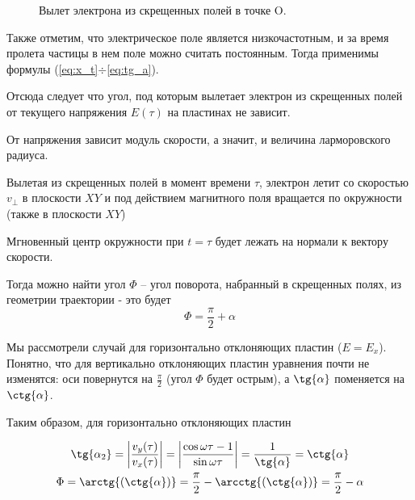 \begin{figure}[ht!]
\vspace{1cm}
\centering
\begin{minipage}[ht!]{0.49\linewidth}
\end{minipage}
\hfill
\begin{minipage}[ht!]{0.49\linewidth}
\end{minipage}
\vspace{0.5cm}
\caption{Вылет электрона из скрещенных полей в точке O.}
\vspace{1cm}
\label{ris:vert_hor}
\end{figure}

Также отметим, что электрическое поле является низкочастотным, и за время пролета частицы в нем поле можно считать постоянным. Тогда применимы формулы (\ref{eq:x_t}$\div$\ref{eq:tg_a}).

Отсюда следует что угол, под которым вылетает электрон из скрещенных полей от текущего напряжения $E(\tau)$ на пластинах не зависит. 

От напряжения зависит модуль скорости, а значит, и величина ларморовского радиуса. 

Вылетая из скрещенных полей в момент времени $\tau$, электрон летит со скоростью $v_\perp$ в плоскости $XY$ и под действием магнитного поля вращается по окружности (также в плоскости $XY$)

Мгновенный центр окружности при $t=\tau$ будет лежать на нормали к вектору скорости.

Тогда можно найти угол $\Phi$ -- угол поворота, набранный в скрещенных полях, из геометрии траектории - это будет $$\Phi=\frac{\pi}{2}+\alpha$$

Мы рассмотрели случай для горизонтально отклоняющих пластин ($E=E_x$). Понятно, что для вертикально отклоняющих пластин уравнения почти не изменятся: оси повернутся на $\frac{\pi}{2}$ (угол $\Phi$ будет острым), а $\tg{\alpha}$ поменяется на $\ctg{\alpha}$.

Таким образом, для горизонтально отклоняющих пластин 

\begin{gather}
	\tg{\alpha_2}=\left|\frac{v_y(\tau)}{v_x(\tau)}\right|=\left|\frac{\cos\omega{\tau}-1}{\sin{\omega{\tau}}}\right|=\frac{1}{\tg{\alpha}}=\ctg{\alpha}\\
	\Phi=\arctg{(\ctg{\alpha})}=\frac{\pi}{2}-\arcctg{(\ctg{\alpha})}=\frac{\pi}{2}-\alpha
\end{gather}

